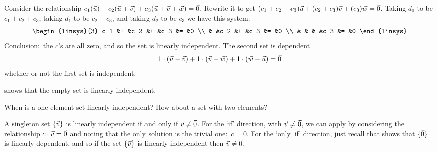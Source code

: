 \begin{exercises}
\begin{answer}
\begin{exparts}
           Consider the relationship
           \( c_1(\vec{u})+c_2(\vec{u}+\vec{v})+c_3(\vec{u}+\vec{v}+\vec{w})
           =\vec{0} \).
           Rewrite it to get
           \( (c_1+c_2+c_3)\vec{u}+(c_2+c_3)\vec{v}+(c_3)\vec{w}=\vec{0} \).
           Taking $d_0$ to be $c_1+c_2+c_3$, taking $d_1$ to be $c_2+c_3$, 
           and taking $d_2$ to be $c_3$ we have this system.
           \begin{equation*}
             \begin{linsys}{3}
               c_1  &+  &c_2  &+  &c_3  &=  &0  \\
                    &   &c_2  &+  &c_3  &=  &0  \\
                    &   &     &   &c_3  &=  &0
             \end{linsys}
           \end{equation*}
           Conclusion:~the $c$'s are all zero, and so the set is linearly
           independent.
        \partsitem The second set is dependent
           \begin{equation*}
             1\cdot(\vec{u}-\vec{v})
             +1\cdot(\vec{v}-\vec{w})
             +1\cdot(\vec{w}-\vec{u})
             =\vec{0}
           \end{equation*}
           whether or not the first set is independent.
      \end{exparts}
    \end{answer}
  \item 
     shows that the empty set is 
    linearly independent.   
    \begin{exparts}
      \partsitem When is a one-element set linearly independent?
      \partsitem How about a set with two elements?
    \end{exparts}
    \begin{answer}
      \begin{exparts}
        \partsitem A singleton set $\mbox{$\{\vec{v}\}$}$ is linearly independent 
          if and only if $\vec{v}\neq\vec{0}$.
          For the `if' direction, with $\vec{v}\neq\vec{0}$, 
          we can apply  by considering 
          the relationship
          \( c\cdot\vec{v}=\vec{0} \) and noting that the only solution
          is the trivial one:~$c=0$.
          For the `only~if' direction, just recall that 
          shows that $\mbox{$\{\vec{0}\}$}$ is linearly dependent, and so if the set
          $\mbox{$\{\vec{v}\}$}$ is linearly independent then $\vec{v}\neq\vec{0}$. 


\end{exparts}
\end{answer}
\end{exercises}
